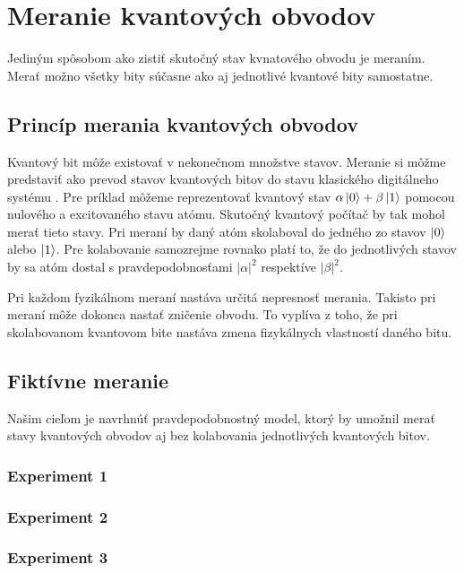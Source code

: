 
\chapter{Meranie kvantových obvodov}

Jediným spôsobom ako zistiť skutočný stav kvnatového obvodu je meraním.
Merať možno všetky bity súčasne ako aj jednotlivé kvantové bity samostatne.

\section{Princíp merania kvantových obvodov}

Kvantový bit môže existovať v nekonečnom množstve stavov. Meranie si môžme 
predstaviť ako prevod stavov kvantových bitov do stavu klasického digitálneho
systému \cite{Nie10}. Pre príklad môžeme reprezentovať kvantový stav 
\(\alpha\ket{0} + \beta\ket{1}\) pomocou nulového a excitovaného stavu atómu.
Skutočný kvantový počítač by tak mohol merať tieto stavy. Pri meraní by 
daný atóm skolaboval do jedného zo stavov \(\ket{0}\) alebo \(\ket{1}\).
Pre kolabovanie samozrejme rovnako platí to, že do jednotlivých stavov by
sa atóm dostal s pravdepodobnosťami \(|\alpha|^2\) respektíve \(|\beta|^2\).


Pri každom fyzikálnom meraní nastáva určitá nepresnosť merania. Takisto 
pri meraní môže dokonca nastať zničenie obvodu. To vyplíva z toho, že pri
skolabovanom kvantovom bite nastáva zmena fizykálnych vlastností daného bitu. 

\section{Fiktívne meranie}

Našim cieľom je navrhnúť pravdepodobnostný model, ktorý by umožnil merať
stavy kvantových obvodov aj bez kolabovania jednotlivých kvantových bitov.

\subsection{Experiment 1}
\subsection{Experiment 2}
\subsection{Experiment 3}
